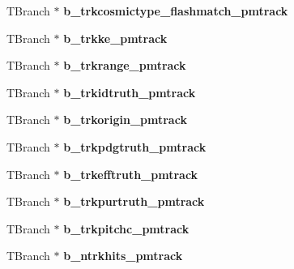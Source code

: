\begin{DoxyCompactItemize}
\item 
\hypertarget{classanatree_a2141229491160d7b5787b70b311b97c0}{T\-Branch $\ast$ {\bfseries b\-\_\-trkcosmictype\-\_\-flashmatch\-\_\-pmtrack}}\label{classanatree_a2141229491160d7b5787b70b311b97c0}

\item 
\hypertarget{classanatree_a70970a51d3ea728b0feec5c368687477}{T\-Branch $\ast$ {\bfseries b\-\_\-trkke\-\_\-pmtrack}}\label{classanatree_a70970a51d3ea728b0feec5c368687477}

\item 
\hypertarget{classanatree_ae0d52d406a991b37a57c790471446a65}{T\-Branch $\ast$ {\bfseries b\-\_\-trkrange\-\_\-pmtrack}}\label{classanatree_ae0d52d406a991b37a57c790471446a65}

\item 
\hypertarget{classanatree_a4604605c7bbdc556d44563ca0919dd9a}{T\-Branch $\ast$ {\bfseries b\-\_\-trkidtruth\-\_\-pmtrack}}\label{classanatree_a4604605c7bbdc556d44563ca0919dd9a}

\item 
\hypertarget{classanatree_a911c9395d91673d18593a99365d3c2c2}{T\-Branch $\ast$ {\bfseries b\-\_\-trkorigin\-\_\-pmtrack}}\label{classanatree_a911c9395d91673d18593a99365d3c2c2}

\item 
\hypertarget{classanatree_a7f6fe6ec9370774fcf0342c2939c10c0}{T\-Branch $\ast$ {\bfseries b\-\_\-trkpdgtruth\-\_\-pmtrack}}\label{classanatree_a7f6fe6ec9370774fcf0342c2939c10c0}

\item 
\hypertarget{classanatree_a108fe48335adb824b5d865f6c6edba3a}{T\-Branch $\ast$ {\bfseries b\-\_\-trkefftruth\-\_\-pmtrack}}\label{classanatree_a108fe48335adb824b5d865f6c6edba3a}

\item 
\hypertarget{classanatree_a91198758c18ed18f94592df4d7fbfe92}{T\-Branch $\ast$ {\bfseries b\-\_\-trkpurtruth\-\_\-pmtrack}}\label{classanatree_a91198758c18ed18f94592df4d7fbfe92}

\item 
\hypertarget{classanatree_a033271b448b4fa957039e353e6bec94e}{T\-Branch $\ast$ {\bfseries b\-\_\-trkpitchc\-\_\-pmtrack}}\label{classanatree_a033271b448b4fa957039e353e6bec94e}

\item 
\hypertarget{classanatree_aeb9c12f33af0fa99e2faa6c95159e5b0}{T\-Branch $\ast$ {\bfseries b\-\_\-ntrkhits\-\_\-pmtrack}}\label{classanatree_aeb9c12f33af0fa99e2faa6c95159e5b0}


\end{DoxyCompactItemize}
